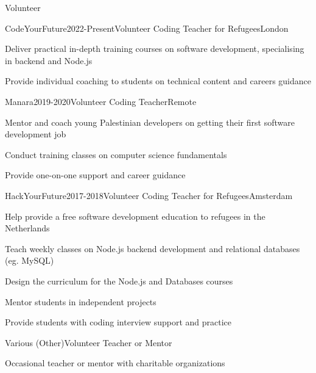 \documentclass{resume} %
\begin{document}
\begin{rSection}{Volunteer}
    \begin{rSubsection}{{CodeYourFuture}}{2022-Present}{Volunteer Coding Teacher for Refugees}{London}
        \item Deliver practical in-depth training courses on software development, specialising in backend and Node.js
        \item Provide individual coaching to students on technical content and careers guidance
    \end{rSubsection}

    \begin{rSubsection}{{Manara}}{2019-2020}{Volunteer Coding Teacher}{Remote}
        \item Mentor and coach young Palestinian developers on getting their first software development job
        \item Conduct training classes on computer science fundamentals
        \item Provide one-on-one support and career guidance
    \end{rSubsection}

    \begin{rSubsection}{{HackYourFuture}}{2017-2018}{Volunteer Coding Teacher for Refugees}{Amsterdam}
        \item Help provide a free software development education to refugees in the Netherlands
        \item Teach weekly classes on Node.js backend development and relational databases (eg. MySQL)
        \item Design the curriculum for the Node.js and Databases courses
        \item Mentor students in independent projects
        \item Provide students with coding interview support and practice
    \end{rSubsection}

    \begin{rSubsection}{{Various (Other)}}{}{Volunteer Teacher or Mentor}{}
        \item Occasional teacher or mentor with charitable organizations
    \end{rSubsection}

\end{rSection}

\end{document}
